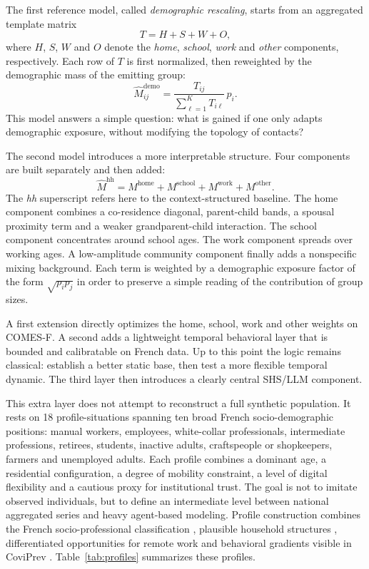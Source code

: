 \documentclass[ROIA,Unicode]{cedram}
\begin{document}
The first reference model, called \emph{demographic rescaling}, starts from an aggregated template matrix
\[
T = H + S + W + O,
\]
where $H$, $S$, $W$ and $O$ denote the \emph{home}, \emph{school}, \emph{work} and \emph{other} components, respectively. Each row of $T$ is first normalized, then reweighted by the demographic mass of the emitting group:
\[
\widehat{M}^{\mathrm{demo}}_{ij} = \frac{T_{ij}}{\sum_{\ell=1}^{K} T_{i\ell}}\, p_i.
\]
This model answers a simple question: what is gained if one only adapts demographic exposure, without modifying the topology of contacts?

The second model introduces a more interpretable structure. Four components are built separately and then added:
\[
\widehat{M}^{\mathrm{hh}} = M^{\mathrm{home}} + M^{\mathrm{school}} + M^{\mathrm{work}} + M^{\mathrm{other}}.
\]
The \emph{hh} superscript refers here to the context-structured baseline. The home component combines a co-residence diagonal, parent-child bands, a spousal proximity term and a weaker grandparent-child interaction. The school component concentrates around school ages. The work component spreads over working ages. A low-amplitude community component finally adds a nonspecific mixing background. Each term is weighted by a demographic exposure factor of the form $\sqrt{p_i p_j}$ in order to preserve a simple reading of the contribution of group sizes.

A first extension directly optimizes the home, school, work and other weights on COMES-F. A second adds a lightweight temporal behavioral layer that is bounded and calibratable on French data. Up to this point the logic remains classical: establish a better static base, then test a more flexible temporal dynamic. The third layer then introduces a clearly central SHS/LLM component.

This extra layer does not attempt to reconstruct a full synthetic population. It rests on 18 profile-situations spanning ten broad French socio-demographic positions: manual workers, employees, white-collar professionals, intermediate professions, retirees, students, inactive adults, craftspeople or shopkeepers, farmers and unemployed adults. Each profile combines a dominant age, a residential configuration, a degree of mobility constraint, a level of digital flexibility and a cautious proxy for institutional trust. The goal is not to imitate observed individuals, but to define an intermediate level between national aggregated series and heavy agent-based modeling. Profile construction combines the French socio-professional classification \citep{insee2016pcs}, plausible household structures \citep{insee2021menages}, differentiated opportunities for remote work \citep{dares2024teletravail} and behavioral gradients visible in CoviPrev \citep{coviprev2021}. Table~\ref{tab:profiles} summarizes these profiles.
\end{document}
